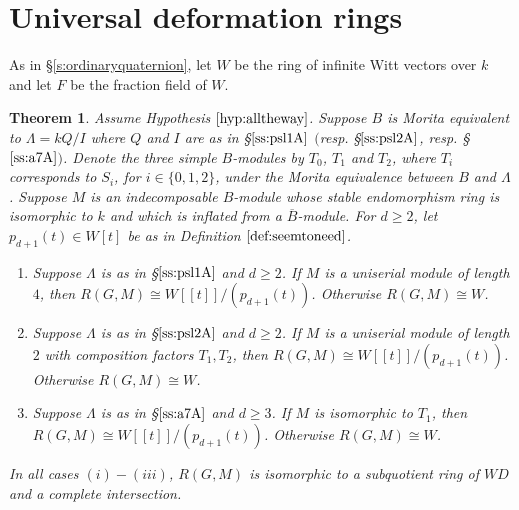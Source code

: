\documentclass{amsart}
\theoremstyle{plain}
\newtheorem{thm}{Theorem}[section]
\theoremstyle{definition}
\theoremstyle{remark}
\begin{document}
\section{Universal deformation rings}
\label{s:udr}
\setcounter{equation}{0}
\setcounter{figure}{0}

As in \S\ref{s:ordinaryquaternion}, let $W$ be the ring of infinite Witt vectors over $k$ 
and let $F$ be the fraction field of $W$.

\begin{thm}
\label{thm:altogether}
Assume Hypothesis $\ref{hyp:alltheway}$.
Suppose $B$ is Morita equivalent to $\Lambda=kQ/I$ where $Q$ and $I$
are as in 
\S$\ref{ss:psl1A}$ $($resp. \S$\ref{ss:psl2A}$, resp. \S$\ref{ss:a7A}$$)$.
Denote the three simple $B$-modules 
by $T_0$, $T_1$ and $T_2$, where $T_i$ corresponds to $S_i$, for 
$i\in\{0,1,2\}$, under the Morita equivalence between $B$ and $\Lambda$.
Suppose $M$ is an indecomposable $B$-module whose stable endomorphism ring
is isomorphic to $k$ and which is inflated from a $\overline{B}$-module.
For $d\ge 2$, let $p_{d+1}(t)\in W[t]$ be as in Definition $\ref{def:seemtoneed}$.
\begin{enumerate}
\item[(i)] Suppose $\Lambda$ is as in 
\S$\ref{ss:psl1A}$
and $d\ge 2$.
If $M$ is a uniserial module of length $4$, then 
$R(G,M)\cong W[[t]]/(p_{d+1}(t))$.
Otherwise $R(G,M)\cong W$.
\item[(ii)] Suppose $\Lambda$ is as in 
\S$\ref{ss:psl2A}$
and $d\ge 2$.
If $M$ is a uniserial module of length $2$ with composition factors $T_1,T_2$, 
then $R(G,M)\cong W[[t]]/(p_{d+1}(t))$.
Otherwise $R(G,M)\cong W$.
\item[(iii)] Suppose $\Lambda$ is as in 
\S$\ref{ss:a7A}$ and $d\ge 3$.
If $M$ is isomorphic to $T_1$, then $R(G,M)\cong W[[t]]/(p_{d+1}(t))$.
Otherwise $R(G,M)\cong W$.
\end{enumerate}
In all cases $(i)-(iii)$, $R(G,M)$ is isomorphic to a subquotient ring of $WD$ and a complete intersection.
\end{thm}
\end{document}
